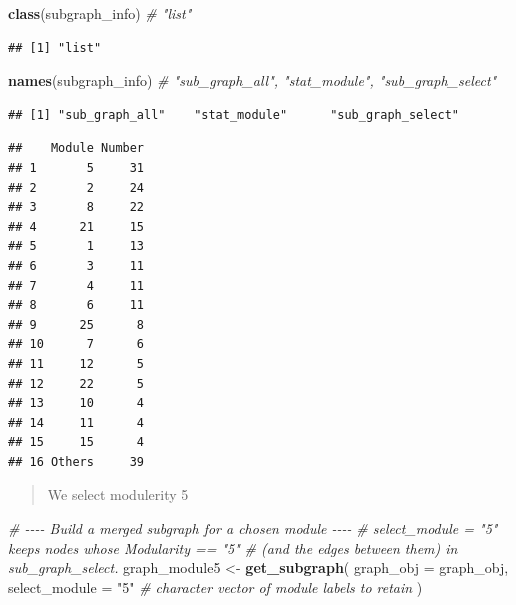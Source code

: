 \documentclass[
]{book}
\newenvironment{Shaded}{\begin{snugshade}}{\end{snugshade}}
\newcommand{\AttributeTok}[1]{\textcolor[rgb]{0.13,0.29,0.53}{#1}}
\newcommand{\CommentTok}[1]{\textcolor[rgb]{0.56,0.35,0.01}{\textit{#1}}}
\newcommand{\FunctionTok}[1]{\textcolor[rgb]{0.13,0.29,0.53}{\textbf{#1}}}
\newcommand{\NormalTok}[1]{#1}
\newcommand{\OtherTok}[1]{\textcolor[rgb]{0.56,0.35,0.01}{#1}}
\newcommand{\SpecialCharTok}[1]{\textcolor[rgb]{0.81,0.36,0.00}{\textbf{#1}}}
\newcommand{\StringTok}[1]{\textcolor[rgb]{0.31,0.60,0.02}{#1}}
\begin{document}
\begin{Shaded}
\begin{Highlighting}[]
\FunctionTok{class}\NormalTok{(subgraph\_info)          }\CommentTok{\# "list"}
\end{Highlighting}
\end{Shaded}

\begin{verbatim}
## [1] "list"
\end{verbatim}

\begin{Shaded}
\begin{Highlighting}[]
\FunctionTok{names}\NormalTok{(subgraph\_info)          }\CommentTok{\# "sub\_graph\_all", "stat\_module", "sub\_graph\_select"}
\end{Highlighting}
\end{Shaded}

\begin{verbatim}
## [1] "sub_graph_all"    "stat_module"      "sub_graph_select"
\end{verbatim}

\begin{Shaded}
\end{Shaded}

\begin{verbatim}
##    Module Number
## 1       5     31
## 2       2     24
## 3       8     22
## 4      21     15
## 5       1     13
## 6       3     11
## 7       4     11
## 8       6     11
## 9      25      8
## 10      7      6
## 11     12      5
## 12     22      5
## 13     10      4
## 14     11      4
## 15     15      4
## 16 Others     39
\end{verbatim}

\begin{quote}
We select modulerity 5
\end{quote}

\begin{Shaded}
\begin{Highlighting}[]
\CommentTok{\# {-}{-}{-}{-} Build a merged subgraph for a chosen module {-}{-}{-}{-}}
\CommentTok{\# \textasciigrave{}select\_module = "5"\textasciigrave{} keeps nodes whose Modularity == "5"}
\CommentTok{\# (and the edges between them) in \textasciigrave{}sub\_graph\_select\textasciigrave{}.}
\NormalTok{graph\_module5 }\OtherTok{\textless{}{-}} \FunctionTok{get\_subgraph}\NormalTok{(}
  \AttributeTok{graph\_obj     =}\NormalTok{ graph\_obj,}
  \AttributeTok{select\_module =} \StringTok{"5"}          \CommentTok{\# character vector of module labels to retain}
\NormalTok{)}
\end{Highlighting}
\end{Shaded}
\end{document}
